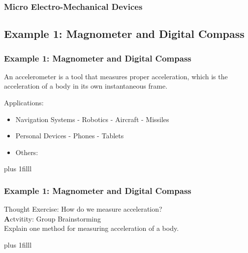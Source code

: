 \documentclass[fleqn]{beamer} %
\newcommand{\sectionIIsubsectionIItitle}{Micro Electro-Mechanical Devices}
\newcommand{\sectionIIsubsectionIIItitle}{Example 1: Magnometer and Digital Compass}
\newcommand{\btVFill}{\vskip0pt plus 1filll}
\begin{document}
			\begin{frame}
				\frametitle{\sectionIIsubsectionIItitle}
				
			

			\end{frame}

		\subsection{\sectionIIsubsectionIIItitle}\label{sectionIIsubsectionIII}

			\begin{frame}
				\frametitle{\sectionIIsubsectionIIItitle}
				An accelerometer is a tool that measures proper acceleration, which is the acceleration of a body in its own instantaneous frame.

				Applications:
				\begin{itemize}
					\item Navigation Systems - Robotics - Aircraft - Missiles
					\item Personal Devices - Phones - Tablets
					\item Others:
				\end{itemize}                                

				\btVFill
				
			\end{frame}

			\begin{frame}
				\frametitle{\sectionIIsubsectionIIItitle}

			 	Thought Exercise: How do we measure acceleration? \vspace{10mm}\\                      
	
			 	{\textbf Actvitity:} Group Brainstorming \\
				Explain one method for measuring acceleration of a body.

			    \btVFill

			\end{frame}
\end{document}
